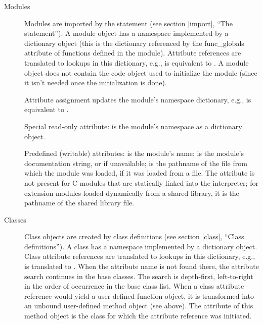 \begin{description}
\begin{description}
\end{description}

\item[Modules]
Modules are imported by the  statement (see section
\ref{import}, ``The  statement'').
A module object has a namespace implemented by a dictionary object
(this is the dictionary referenced by the func_globals attribute of
functions defined in the module).  Attribute references are translated
to lookups in this dictionary, e.g.,  is equivalent to
.
A module object does not contain the code object used to
initialize the module (since it isn't needed once the initialization
is done).

Attribute assignment updates the module's namespace dictionary,
e.g.,  is equivalent to .

Special read-only attribute:  is the module's
namespace as a dictionary object.

Predefined (writable) attributes: 
is the module's name;  is the
module's documentation string, or
 if unavailable;  is the pathname of the
file from which the module was loaded, if it was loaded from a file.
The  attribute is not present for C{} modules that are
statically linked into the interpreter; for extension modules loaded
dynamically from a shared library, it is the pathname of the shared
library file.

\item[Classes]
Class objects are created by class definitions (see section
\ref{class}, ``Class definitions'').
A class has a namespace implemented by a dictionary object.
Class attribute references are translated to
lookups in this dictionary,
e.g.,  is translated to .
When the attribute name is not found
there, the attribute search continues in the base classes.  The search
is depth-first, left-to-right in the order of occurrence in the
base class list.
When a class attribute reference would yield a user-defined function
object, it is transformed into an unbound user-defined method object
(see above).  The  attribute of this method object is the
class for which the attribute reference was initiated.


\end{description}
